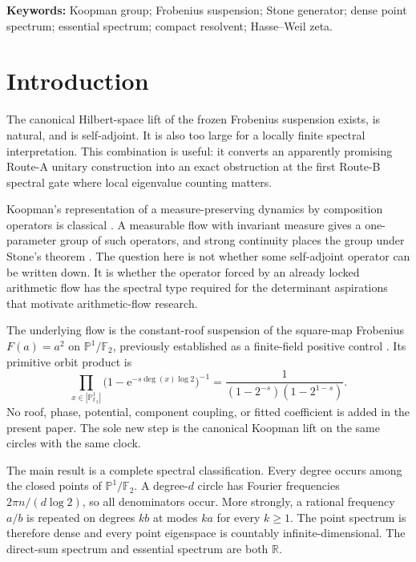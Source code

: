 \documentclass[11pt]{article}
\theoremstyle{definition}
\theoremstyle{remark}
\newcommand{\R}{\mathbb{R}}
\newcommand{\F}{\mathbb{F}}
\newcommand{\e}{\mathrm{e}}
\begin{document}
\medskip
\noindent\textbf{Keywords:} Koopman group; Frobenius suspension; Stone
generator; dense point spectrum; essential spectrum; compact resolvent;
Hasse--Weil zeta.

\section{Introduction}
\label{sec:introduction}

The canonical Hilbert-space lift of the frozen Frobenius suspension exists,
is natural, and is self-adjoint.  It is also too large for a locally finite
spectral interpretation.  This combination is useful: it converts an
apparently promising Route-A unitary construction into an exact obstruction
at the first Route-B spectral gate where local eigenvalue counting matters.

Koopman's representation of a measure-preserving dynamics by composition
operators is classical \citep{Koopman1931}.  A measurable flow with invariant
measure gives a one-parameter group of such operators, and strong continuity
places the group under Stone's theorem \citep{Stone1932,TerElstLemanczyk2017}.
The question here is not whether some self-adjoint operator can be written
down.  It is whether the operator forced by an already locked arithmetic flow
has the spectral type required for the determinant aspirations that motivate
arithmetic-flow research.

The underlying flow is the constant-roof suspension of the square-map
Frobenius \(F(a)=a^2\) on \(\mathbb P^1/\F_2\), previously established as a
finite-field positive control \citep{WangFrobenius2026}.  Its primitive orbit
product is
\[
 \prod_{x\in|\mathbb P^1_{\F_2}|}
   \bigl(1-\e^{-s\deg(x)\log2}\bigr)^{-1}
 =\frac{1}{(1-2^{-s})(1-2^{1-s})}.
\]
No roof, phase, potential, component coupling, or fitted coefficient is added
in the present paper.  The sole new step is the canonical Koopman lift on the
same circles with the same clock.

The main result is a complete spectral classification.  Every degree occurs
among the closed points of \(\mathbb P^1/\F_2\).  A degree-\(d\) circle has
Fourier frequencies \(2\pi n/(d\log2)\), so all denominators occur.  More
strongly, a rational frequency \(a/b\) is repeated on degrees \(kb\) at modes
\(ka\) for every \(k\geq1\).  The point spectrum is therefore dense and every
point eigenspace is countably infinite-dimensional.  The direct-sum spectrum
and essential spectrum are both \(\R\).
\end{document}
